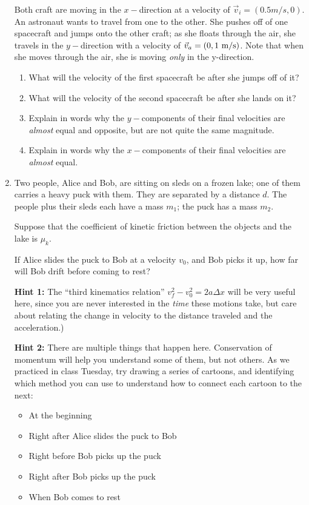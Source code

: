 \documentclass[12pt]{article}
\begin{document}
\begin{enumerate}
	Both craft are moving in the $x-$direction at a velocity of $\vec v_i = (0.5 m/s, 0)$. An astronaut wants to travel from one to the other. She pushes off of one spacecraft and jumps onto the other craft; as she floats through the air, she travels in the $y-$direction with a velocity of $\vec v_a = (0, 1~\rm m/\rm s)$. Note that when she moves through the air, she is moving {\it only} in the y-direction.


		\begin{enumerate}
			\item What will the velocity of the first spacecraft be after she jumps off of it?
			\item What will the velocity of the second spacecraft be after she lands on it?
			\item Explain in words why the $y-$components of their final velocities are {\it almost} equal and opposite, but are not quite the same magnitude.
			\item Explain in words why the $x-$components of their final velocities are {\it almost} equal.
		\end{enumerate}

\item Two people, Alice and Bob, are sitting on sleds on a frozen lake; one of them carries a heavy puck with them. They are separated by a distance $d$. The people plus their sleds each have a mass $m_1$; the puck has a mass $m_2$.

	Suppose that the coefficient of kinetic friction between the objects and the lake is $\mu_k$.

	If Alice slides the puck to Bob at a velocity $v_0$, and Bob picks it up, how far will Bob drift before coming to rest?

		{\bf Hint 1:} The ``third kinematics relation'' $v_f^2 - v_0^2 = 2a\Delta x$ will be very useful here, since you are never interested in the {\it time} these motions take, but care about relating the change in velocity to the distance traveled and the acceleration.)

		{\bf Hint 2:} There are multiple things that happen here. Conservation of momentum will help you understand some of them, but not others. As we practiced in class Tuesday, try drawing a series of cartoons, and identifying which method you can use to understand how to connect each cartoon to the next:

		\begin{itemize}
	\item At the beginning
	\item Right after Alice slides the puck to Bob
	\item Right before Bob picks up the puck
	\item Right after Bob picks up the puck
	\item When Bob comes to rest
		\end{itemize}





\end{enumerate}
   
\end{document}
